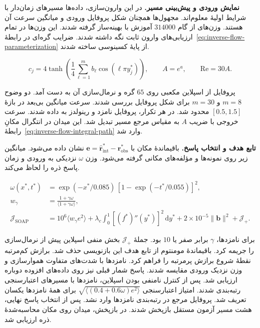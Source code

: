 \FloatBarrier
{}
\label{sec:inverse-flow-soap-rewrite}
\begin{FlowRevisionText}
\textbf{نمایش ورودی و پیش‌بینی مسیر.}
در این وارون‌سازی، داده‌ها مسیرهای زمان‌دار با شرایط اولیهٔ معلوم‌اند.
مجهول‌ها همچنان شکل پروفایل ورودی و میانگین سرعت آن هستند.
وزن‌های  از گام $314000$ آموزش با بهینه‌ساز  گرفته شدند.
این وزن‌ها در تمام ارزیابی‌های وارون ثابت نگه داشته شدند.
ضرایب گره‌ای در رابطهٔ~\eqref{eq:inverse-flow-parameterization} از پایهٔ کسینوسی ساخته شدند.

\begin{equation}
c_j=4\tanh\!\left(\frac{1}{4}\sum_{\ell=1}^{m}b_\ell
                   \cos(\ell\pi y_j^*)\right),\qquad
A=e^a,\qquad \mathrm{Re}=30A .
\label{eq:inverse-flow-soap-basis}
\end{equation}

پروفایل از اسپلاین مکعبی روی $65$ گره و نرمال‌سازی آن به دست آمد.
دو وضوح $m=8$ و $m=30$ برای شکل پروفایل بررسی شدند.
سرعت میانگین بی‌بعد در بازهٔ $[0.5,1.5]$ محدود شد.
در هر تکرار، پروفایل نامزد و رینولدز به  داده شدند.
سرعت خروجی با ضریب $A$ به مقیاس مرجع مسیر تبدیل شد.
این میدان در انتگرال مکانِ رابطهٔ~\eqref{eq:inverse-flow-integral-path} وارد شد.

\textbf{تابع هدف و انتخاب پاسخ.}
باقیماندهٔ مکان با $\mathbf e=\widehat{\mathbf r}_{\mathrm{int}}^*-\mathbf r_{\mathrm{obs}}^*$ نشان داده می‌شود.
میانگین زیر روی نمونه‌ها و مؤلفه‌های مکانی گرفته می‌شود.
وزن $\omega$ نزدیکی به ورودی و زمان پاسخ ذره را لحاظ می‌کند.

\begin{equation}
\begin{aligned}
\omega(x^*,t^*)&=\exp(-x^*/0.085)\,[1-\exp(-t^*/0.055)]^2,\\
w_\gamma&=\frac{1+\gamma\omega}{\langle 1+\gamma\omega\rangle},\\
\mathcal J_{\mathrm{SOAP}}&=10^6\langle w_\gamma e^2\rangle+
 \lambda_c\int_0^1[(f^*)''(y^*)]^2\,\mathrm dy^*
 +2\times10^{-5}\|\mathbf b\|^2+\mathcal J_+ .
\end{aligned}
\label{eq:inverse-flow-soap-loss}
\end{equation}

برای نامزدها، $\gamma$ برابر صفر یا $10$ بود.
جملهٔ $\mathcal J_+$ بخش منفی اسپلاین پیش از نرمال‌سازی را جریمه کرد.
باقیماندهٔ مومنتوم از تابع هدف این بازنویسی حذف شد.
برازش کم‌مرتبه نقطهٔ شروع برازش پرمرتبه را فراهم کرد.
نامزدها با شدت‌های متفاوت هموارسازی و وزن نزدیک ورودی مقایسه شدند.
پاسخ شمار قبلی نیز روی داده‌های افزوده دوباره ارزیابی شد.
پس از کنترل نامنفی بودن اسپلاین، نامزدها با مسیرهای اعتبارسنجی رتبه‌بندی شدند.
امتیاز اعتبارسنجی $\sqrt{\langle(0.4+0.6\omega)e^2\rangle}$ برای همهٔ نامزدها یکسان تعریف شد.
پروفایل مرجع در رتبه‌بندی نامزدها وارد نشد.
پس از انتخاب پاسخ نهایی، هشت مسیر آزمون مستقل بازپخش شدند.
در بازپخش، میدان روی مکان محاسبه‌شدهٔ ذره ارزیابی شد.


\end{FlowRevisionText}
